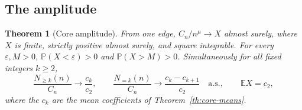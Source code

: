 \documentclass[11pt]{article}
\newtheorem{theorem}{Theorem}
\newcommand{\resulttag}{?}
\newcommand{\tagnext}[1]{\renewcommand{\resulttag}{#1}}
\theoremstyle{remark}
\numberwithin{equation}{section}
\begin{document}
\subsection{The amplitude}\label{sec:core-amp}
\tagnext{AMP}
\begin{theorem}[Core amplitude]\label{th:core-amplitude}
From one edge, $C_n/n^\mu\to X$ almost surely, where $X$ is finite, strictly positive almost surely, and square integrable. For every $\varepsilon,M>0$, $\mathbb P(X<\varepsilon)>0$ and $\mathbb P(X>M)>0$. Simultaneously for all fixed integers $k\ge2$,
\[
 \frac{N_{\ge k}(n)}{C_n}\longrightarrow\frac{c_k}{c_2},\qquad
 \frac{N_{=k}(n)}{C_n}\longrightarrow\frac{c_k-c_{k+1}}{c_2}
 \quad\text{a.s.},\qquad \mathbb E X=c_2,
\]
where the $c_k$ are the mean coefficients of Theorem~\ref{th:core-means}.
\end{theorem}
\end{document}
